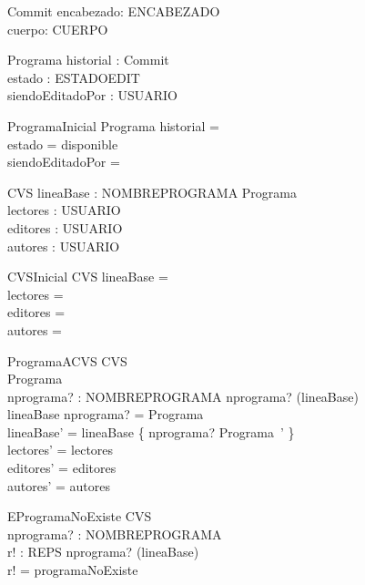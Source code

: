 \documentclass[11pt]{article}
\begin{document}
  \begin{schema}{Commit}
  encabezado: ENCABEZADO \\
  cuerpo: CUERPO
  \end{schema}
  
  \begin{schema}{Programa}
  historial : \seq Commit \\
  estado : ESTADOEDIT \\
  siendoEditadoPor : \power USUARIO
  \end{schema}
  
  \begin{schema}{ProgramaInicial}
  Programa
  \where
  historial = \emptyset \\
  estado = disponible \\
  siendoEditadoPor = \emptyset
  \end{schema}
  
  \begin{schema}{CVS}
  lineaBase : NOMBREPROGRAMA \pfun Programa \\
  lectores : \power USUARIO \\
  editores : \power USUARIO \\
  autores : \power USUARIO
  \end{schema}
  
  \begin{schema}{CVSInicial}
  CVS
  \where
  lineaBase = \emptyset \\
  lectores = \emptyset \\
  editores = \emptyset \\
  autores = \emptyset
  \end{schema}
  
  \begin{schema}{ProgramaACVS}
  \Delta CVS \\
  \Delta Programa \\
  nprograma? : NOMBREPROGRAMA
  \where
  nprograma? \in (\dom lineaBase) \\
  lineaBase \; nprograma? = \theta Programa \\
  lineaBase' = lineaBase \oplus \{ nprograma? \mapsto \theta Programa\ ' \} \\
  lectores' = lectores \\
  editores' = editores \\
  autores' = autores
  \end{schema}
  
  \begin{schema}{EProgramaNoExiste}
  \Xi CVS \\
  nprograma? : NOMBREPROGRAMA \\
  r! : REPS
  \where
  nprograma? \notin (\dom lineaBase) \\
  r! = programaNoExiste
  \end{schema}
  
\end{document}
